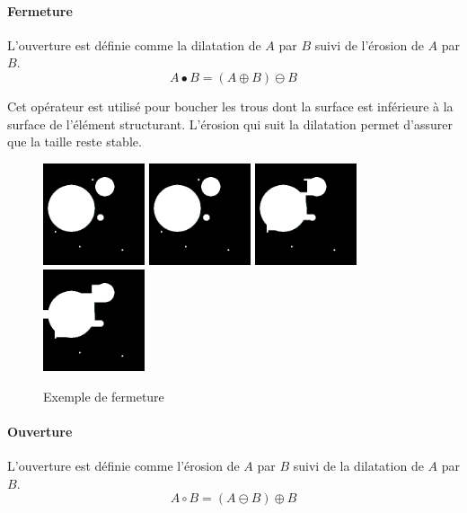 \paragraph{Fermeture}
L'ouverture est définie comme la dilatation de $A$ par $B$ suivi de l'érosion de $A$ par $B$.
\begin{equation}
 A \bullet B = (A \oplus B) \ominus B
\end{equation}

Cet opérateur est utilisé pour boucher les trous dont la surface est inférieure à la surface de l'élément structurant. L'érosion qui suit la dilatation permet d'assurer que la taille reste stable.

\begin{figure}
  \centering
  \includegraphics[height=3cm]{Images/morpho_init.png}
  \includegraphics[height=3cm]{Images/morpho_close_k5.png}
  \includegraphics[height=3cm]{Images/morpho_close_k21.png}
  \includegraphics[height=3cm]{Images/morpho_close_k31.png}
  \label{fig:morpho_femerture}
  \caption{Exemple de fermeture}
\end{figure}

\paragraph{Ouverture}
L'ouverture est définie comme l'érosion de $A$ par $B$ suivi de la dilatation de $A$ par $B$.
\begin{equation}
 A \circ B = (A \ominus B) \oplus B
\end{equation}

